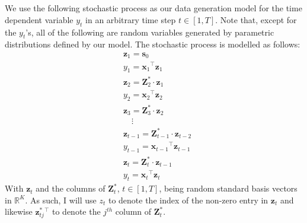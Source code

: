 \section{}

We use the following stochastic process as our data generation model for the time dependent variable $y_t$ in an arbitrary time step $t\in[1,T]$.
Note that, except for the $y_t$'s, all of the following are random variables generated by parametric distributions defined by our model.
The stochastic process is modelled as follows:
\begin{align}
    \nonumber&\mathbf{z}_{1} =  \mathbf{s}_0\\
    \nonumber&y_1 =  \mathbf{x}_1 {}^\intercal  \mathbf{z}_1\\
    \nonumber&\mathbf{z}_{2} =  \mathbf{Z}_2^*{}\cdot \mathbf{z}_1 \\
    \nonumber&y_2 = \mathbf{x}_2 {}^\intercal \mathbf{z}_2 \\
    \nonumber&\mathbf{z}_{3} =  \mathbf{Z}_3^*{}\cdot \mathbf{z}_2 \\
    \nonumber&\quad \vdots \\
    \nonumber&\mathbf{z}_{t-1} =  \mathbf{Z}^*_{t-1}{}\cdot \mathbf{z}_{t-2} \\
    \label{q2:model_transition1}
    &y_{t-1} =  \mathbf{x}_{t-1} {}^\intercal \mathbf{z}_{t-1} \\
    \label{q2:model_transition2}
    &\mathbf{z}_{t} =  \mathbf{Z}^*_{t}{}\cdot \mathbf{z}_{t-1} \\
    &y_{t} = \mathbf{x}_{t} {}^\intercal \mathbf{z}_t
    \label{q2:model}
\end{align}
With $\mathbf{z}_t$  and the columns of $\mathbf{Z}^*_t$, $t \in [1, T]$, being random standard basis vectors in $\mathbb{R}^K$.
As such, I will use $z_t$ to denote the index of the non-zero entry in $\mathbf{z}_t$ and likewise $\mathbf{z}^*_{tj}{}^\intercal$ to denote the $j^{th}$ column of $\mathbf{Z}_t^*$.

